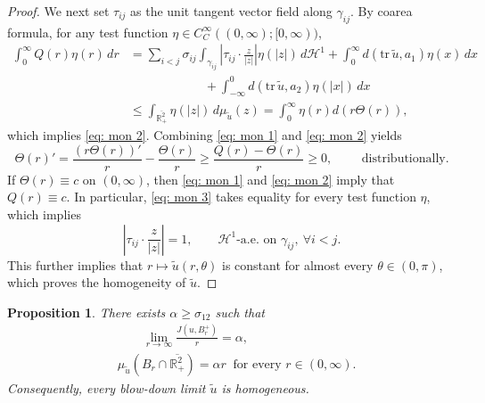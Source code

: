 \documentclass[leqno,11pt]{amsart}
\let\al=\alpha
\let\g=\gamma
\let\f=\frac
\let\T=\Theta
\newtheorem{proposition}[theorem]{Proposition}
\theoremstyle{remark}
\newcommand{\BR}{\mathbb{R}}
\newcommand{\ch}{\mathcal{H}^1}
\newcommand{\tu}{\tilde{u}}
\begin{document}
\begin{proof}
    We next set $\tau_{ij}$ as the unit tangent vector field along $\g_{ij}$. By coarea formula, for any test function $\eta\in C_C^\infty((0,\infty);[0,\infty))$,
    \begin{equation}\label{eq: mon 3}
    \begin{split}
      \int_{0}^{\infty} Q(r)\eta(r)\,dr&= \sum_{i<j}\sigma_{ij} \int_{\g_{ij}} \left|\tau_{ij}\cdot \f{z}{|z|}\right|\eta(|z|)\,d\ch+ \int_0^\infty  d(\mathrm{tr}\,\tu, a_1) \eta(x) \,dx \\
      &\qquad\qquad\qquad+  \int_{-\infty}^0 d(\mathrm{tr}\,\tu,a_2)\eta(|x|)\,dx\\
      &\leq \int_{\overline{\BR_+^2}} \eta(|z|)\,d\mu_{\tu}(z)=\int_0^\infty \eta(r) d(r\T(r)), 
      \end{split}
    \end{equation}
    which implies \eqref{eq: mon 2}. Combining \eqref{eq: mon 1} and \eqref{eq: mon 2} yields 
    \begin{equation*}
        \T(r)'=\f{(r\T(r))'}{r}-\f{\T(r)}{r}\geq \f{Q(r)-\T(r)}{r}\geq 0, \qquad \text{ distributionally.} \end{equation*}
    If $\T(r)\equiv c$ on $(0,\infty)$, then \eqref{eq: mon 1} and \eqref{eq: mon 2} imply that $Q(r)\equiv c$. In particular, \eqref{eq: mon 3} takes equality for every test function $\eta$, which implies 
    \begin{equation*}
       \left|\tau_{ij}\cdot \f{z}{|z|}\right|=1,\qquad \ch\text{-a.e. on }\g_{ij},\ \forall i<j. 
    \end{equation*}
    This further implies that $r\mapsto \tu(r,\theta)$ is constant for almost every $\theta\in(0,\pi)$, which proves the homogeneity of $\tu$.
    
    \end{proof}

\begin{proposition}\label{prop:homogenity of blowdown}
There exists $\al\geq \sigma_{12}$ such that 
\begin{align}
   \label{homog 1} &\qquad\lim\limits_{r\to\infty} \f{J(u,B_r^+)}{r}=\al,\\
   \label{homog 2}&\mu_{\tu}(B_r\cap \overline{\BR_+^2})=\al r\ \text{ for every }r\in(0,\infty). 
\end{align}
Consequently, every blow-down limit $\tu$ is homogeneous.
\end{proposition}
\end{document}
